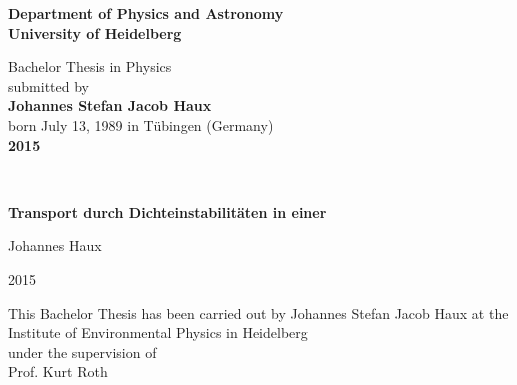 \begin{titlepage}
\begin{center}
 
\Large\textbf{Department of Physics and Astronomy\\
University of Heidelberg}

\vspace{16cm}

\normalsize
Bachelor Thesis in Physics\\
submitted by \\
\vspace{0.5cm}
\Large\textbf{Johannes Stefan Jacob Haux}\\
\normalsize
\vspace{0.5cm}
born July 13, 1989 in Tübingen (Germany)\\
\vspace{0.5cm}
\Large\textbf{2015}
\normalsize

\newpage

\mbox{\,}

\vspace{3cm}

\Huge
\onehalfspacing

\textbf{Transport durch Dichteinstabilitäten in einer \HSC}

\normalsize
\singlespacing

\vspace{3cm}

Johannes Haux

2015


\vspace{8cm}

\normalsize
This Bachelor Thesis has been carried out by Johannes Stefan Jacob Haux at the\\
Institute of Environmental Physics in Heidelberg\\
under the supervision of\\
Prof. Kurt Roth

\vfill
\end{center}
\newpage
\end{titlepage}
